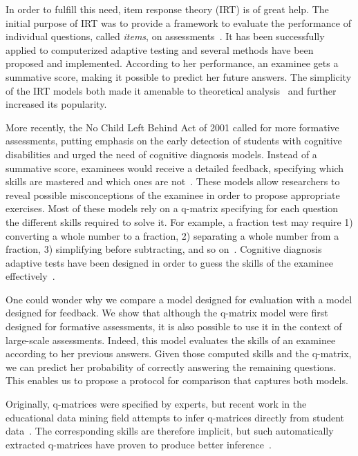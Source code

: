\documentclass{sig-alternate}
\begin{document}
In order to fulfill this need, item response theory (IRT) is of great help. The initial purpose of IRT was to provide a framework to evaluate the performance of individual questions, called \emph{items}, on assessments~\cite{Hambleton1991}. It has been successfully applied to computerized adaptive testing and several methods have been proposed and implemented. According to her performance, an examinee gets a summative score, making it possible to predict her future answers. The simplicity of the IRT models both made it amenable to theoretical analysis~\cite{Baker2004} and further increased its popularity.

More recently, the No Child Left Behind Act of 2001 called for more formative assessments, putting emphasis on the early detection of students with cognitive disabilities and urged the need of cognitive diagnosis models. Instead of a summative score, examinees would receive a detailed feedback, specifying which skills are mastered and which ones are not~\cite{Cheng2009}. These models allow researchers to reveal possible misconceptions of the examinee in order to propose appropriate exercises. Most of these models rely on a q-matrix specifying for each question the different skills required to solve it. For example, a fraction test may require 1) converting a whole number to a fraction, 2) separating a whole number from a fraction, 3) simplifying before subtracting, and so on~\cite{DeLaTorreDouglas2004}. Cognitive diagnosis adaptive tests have been designed in order to guess the skills of the examinee effectively~\cite{Huebner2010}.

One could wonder why we compare a model designed for evaluation with a model designed for feedback. We show that although the q-matrix model were first designed for formative assessments, it is also possible to use it in the context of large-scale assessments. Indeed, this model evaluates the skills of an examinee according to her previous answers. Given those computed skills and the q-matrix, we can predict her probability of correctly answering the remaining questions. This enables us to propose a protocol for comparison that captures both models.

Originally, q-matrices were specified by experts, but recent work in the educational data mining field attempts to infer q-matrices directly from student data~\cite{Huebner2010}. The corresponding skills are therefore implicit, but such automatically extracted q-matrices have proven to produce better inference~\cite{Barnes2003}.
\end{document}
